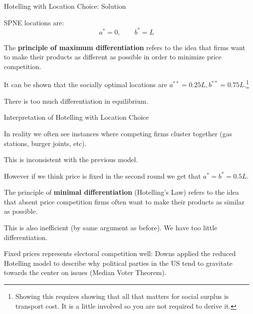 \documentclass[aspectratio=169]{beamer}
\newenvironment{wideitemize}{\itemize\addtolength{\itemsep}{10pt}}{\enditemize}
\begin{document}
\begin{frame}{Hotelling with Location Choice: Solution}
    \begin{wideitemize}
        \item SPNE locations are:
        \[a^*=0, \qquad b^*=L\]
        \begin{definition}
        The \textbf{principle of maximum differentiation} refers to the idea that firms want to make their products as different as possible in order to minimize price competition.
        \end{definition}
        \item It can be shown that the socially optimal locations are $a^{**}=0.25 L, b^{**}=0.75L$.\footnote{Showing this requires showing that all that matters for social surplus is transport cost. It is a little involved so you are not required to derive it.}
        \item There is too much differentiation in equilibrium.
        
    \end{wideitemize}
\end{frame}

\begin{frame}{Interpretation of Hotelling with Location Choice}
\begin{wideitemize}
    \item In reality we often see instances where competing firms cluster together (gas stations, burger joints, etc).
    \item This is inconsistent with the previous model.
    \item However if we think price is fixed in the second round we get that $a^*=b^*=0.5L$.
    \begin{definition}
    The principle of \textbf{minimal differentiation} (Hotelling's Law) refers to the idea that absent price competition firms often want to make their products as similar as possible.
    \end{definition}
    \item This is also inefficient (by same argument as before). We have too little differentiation.
    \item Fixed prices represents electoral competition well: Downs applied the reduced Hotelling model to describe why political parties in the US tend to gravitate towards the center on issues (Median Voter Theorem).
    
\end{wideitemize}
    
\end{frame}
\end{document}
